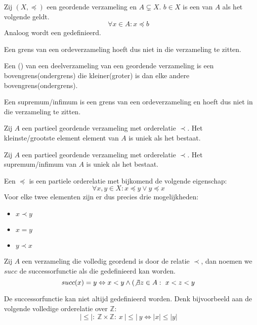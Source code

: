 \documentclass[main.tex]{subfiles}
\begin{document}
\begin{de}
  Zij $(X,\preceq)$ een geordende verzameling en $A \subsetneq X$.
  $b \in X$ is een  van $A$ als het volgende geldt.
  \[ \forall x \in A: x \preceq b \]
  Analoog wordt een  gedefinieerd.
\end{de}

\begin{opm}
  Een grens van een ordeverzameling hoeft dus niet in die verzameling te zitten.
\end{opm}

\begin{de}
  Een () van een deelverzameling van een geordende verzameling is een bovengrens(ondergrens) die kleiner(groter) is dan elke andere bovengrens(ondergrens).
\end{de}

\begin{opm}
  Een supremum/infimum is een grens van een ordeverzameling en hoeft dus niet in die verzameling te zitten.
\end{opm}

\begin{st}
  Zij $A$ een partieel geordende verzameling met orderelatie $\prec$.
  Het kleinste/grootste element element van $A$ is uniek als het bestaat.

\end{st}

\begin{st}
  Zij $A$ een partieel geordende verzameling met orderelatie $\prec$.
  Het supremum/infimum van $A$ is uniek als het bestaat.

\end{st}

\begin{de}
  Een  $\preceq$ is een partiele orderelatie met bijkomend de volgende eigenschap:
  \[ \forall x,y \in X: x \preceq y \vee y \preceq x \]
  Voor elke twee elementen zijn er dus precies drie mogelijkheden:
  \begin{itemize}
  \item $x \prec y$
  \item $x = y$
  \item $y \prec x$
  \end{itemize}
\end{de}

\begin{de}
  Zij $A$ een verzameling die volledig geordend is door de relatie $\prec$, dan noemen we $succ$ de successorfunctie als die gedefinieerd kan worden.
  \[ succ(x) = y \Leftrightarrow x < y \wedge (\not\exists z \in A:\ x < z < y \]
\end{de}

\begin{opm}
  De successorfunctie kan niet altijd gedefinieerd worden.
  Denk bijvoorbeeld aan de volgende volledige orderelatie over $\mathbb{Z}$:
  \[ |\le|:\ \mathbb{Z} \times \mathbb{Z}:\ x\ |\le|\ y \Leftrightarrow |x| \le |y| \]
\end{opm}
\end{document}
